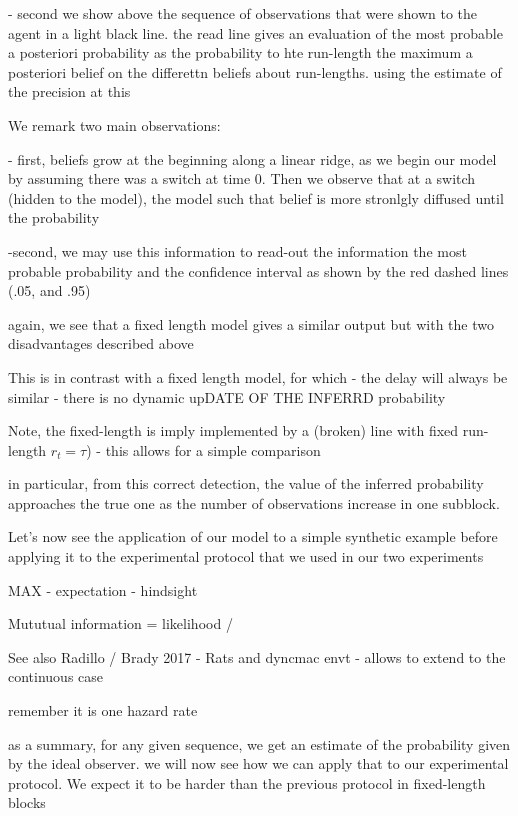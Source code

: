 \documentclass[profile,final,english, draft]{article}%
\begin{document}
- second we show above the sequence of observations that were shown to the agent in a light black line. the read line gives an evaluation of the most probable a posteriori probability as the probability to hte run-length the maximum a posteriori belief on the differettn beliefs about run-lengths. using the estimate of the precision at this

We remark two main observations:

- first, beliefs grow at the beginning along a linear ridge, as we begin our model by assuming there was a switch at time 0. Then we observe that at a switch (hidden to the model), the model
such that belief is more stronlgly diffused until the probability

-second, we may use this information to read-out the information the most probable probability and the confidence interval as shown by the red dashed lines (.05, and .95)

again, we see that a fixed length model gives a similar output
but with the two disadvantages described above

This is in contrast with a fixed length model, for which
- the delay will always be similar
- there is no dynamic upDATE OF THE INFERRD probability

Note, the fixed-length is imply implemented by a (broken) line with fixed run-length $r_t=\tau$) - this allows for a simple comparison


in particular, from this correct detection,
the value of the inferred probability approaches
the true one as the number of observations increase in one subblock.


Let's now see the application of our model to a simple synthetic example before applying it to the experimental protocol that we used in our two experiments

MAX - expectation - hindsight

Mututual information = likelihood /




See also Radillo / Brady 2017 - Rats and dyncmac envt - allows to extend to the continuous case


remember it is one hazard rate

as a summary, for any given sequence,
 we get an estimate of the probability given by the ideal observer.
 we will now see how we can apply that to our experimental protocol.
 We expect it to be harder than the previous protocol
 in fixed-length blocks
\end{document}
